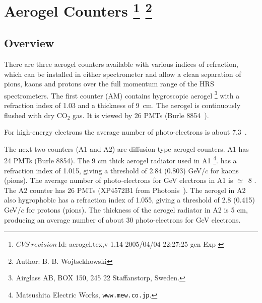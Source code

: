 \chapter[Aerogel \Cherenkov{} Counter]{Aerogel \Cherenkov{} Counters
\footnote{
  $CVS~revision~ $Id: aerogel.tex,v 1.14 2005/04/04 22:27:25 gen Exp $ $
}
\footnote{Author: B. B. Wojtsekhowski }
}
\label{chap:hrs-aerogel}

\section{Overview}

There are three aerogel \Cherenkov{} counters available with various indices
of refraction, which can be installed in either spectrometer 
and allow a clean separation of pions, kaons and protons over 
the full momentum range of the HRS spectrometers.
The first counter (AM) contains hygroscopic aerogel%
\footnote{Airglass AB, BOX 150, 245 22 Staffanstorp, Sweden.}
with a refraction index of 1.03 and a thickness of 9~cm. 
The aerogel is continuously flushed with dry CO$_{2}$ gas.  
It is viewed by 26 PMTs (Burle 8854~\cite{BurleInd}).

For high-energy electrons the average 
number of photo-electrons is about 7.3~\cite{Brash:2002vn}.

The next two counters (A1 and A2) are diffusion-type aerogel counters.
A1 has 24 PMTs (Burle 8854). The 9 cm thick aerogel radiator used in A1
\footnote{ Matsushita Electric Works, {\tt www.mew.co.jp}.}.
has a refraction index of 1.015, giving a threshold of 2.84 (0.803) GeV/$c$ for
kaons (pions). The average number of photo-electrons for GeV electrons
in A1 is $\simeq$~8%
.
 The A2 counter has 26 PMTs
(XP4572B1 from Photonis~\cite{PhotonisInd}).
The aerogel in A2 also hygrophobic has a refraction index of 1.055, 
giving a threshold of 2.8 (0.415) GeV/$c$ for protons (pions). 
The thickness of the aerogel radiator in A2 is 5 cm, producing an average
number of about 30 photo-electrons for GeV electrons.


